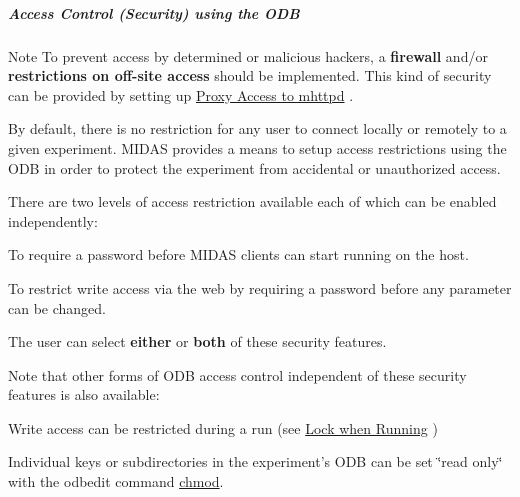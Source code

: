 \par


\par


\label{RC_customize_ODB_idx_access-control_ODB}
\hypertarget{RC_customize_ODB_idx_access-control_ODB}{}
 \label{RC_customize_ODB_idx_ODB-access-control}
\hypertarget{RC_customize_ODB_idx_ODB-access-control}{}
 \hypertarget{RC_customize_ODB_RC_Access_Control}{}\subparagraph{Access Control (Security) using the ODB}\label{RC_customize_ODB_RC_Access_Control}
\begin{DoxyNote}{Note}
To prevent access by determined or malicious hackers, a {\bfseries firewall} and/or {\bfseries restrictions on off-\/site access} should be implemented. This kind of security can be provided by setting up \hyperlink{RC_mhttpd_utility_RC_mhttpd_proxy}{Proxy Access to mhttpd} . \par

\end{DoxyNote}
By default, there is no restriction for any user to connect locally or remotely to a given experiment. MIDAS provides a means to setup access restrictions using the ODB in order to protect the experiment from accidental or unauthorized access.

There are two levels of access restriction available each of which can be enabled independently:
\begin{DoxyItemize}
\item To require a password before MIDAS clients can start running on the host.
\item To restrict write access via the web by requiring a password before any parameter can be changed.
\end{DoxyItemize}

The user can select {\bfseries either} or {\bfseries both} of these security features.

Note that other forms of ODB access control independent of these security features is also available:


\begin{DoxyItemize}
\item Write access can be restricted during a run (see \hyperlink{RC_customize_ODB_RC_Lock_when_Running}{Lock when Running} )
\item Individual keys or subdirectories in the experiment's ODB can be set \char`\"{}read only\char`\"{} with the odbedit command \hyperlink{RC_odbedit_examples_RC_odbedit_chmod}{chmod}.
\end{DoxyItemize}

